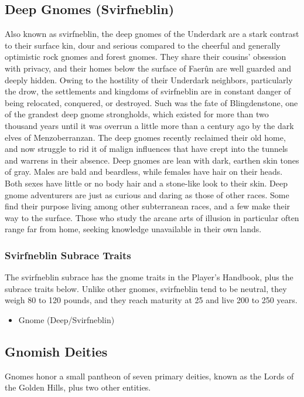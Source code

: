 \documentclass[10pt,a4paper,twoside,twocolumn,openany,bg=print,nodeprecatedcode]{dndbook}
\begin{document}
\subsection{Deep Gnomes (Svirfneblin)}
Also known as svirfneblin, the deep gnomes of the Underdark are a stark contrast to their surface kin, dour and serious compared to the cheerful and generally optimistic rock gnomes and forest gnomes. They share their cousins' obsession with privacy, and their homes below the surface of Faerûn are well guarded and deeply hidden.
Owing to the hostility of their Underdark neighbors, particularly the drow, the settlements and kingdoms of svirfneblin are in constant danger of being relocated, conquered, or destroyed. Such was the fate of Blingdenstone, one of the grandest deep gnome strongholds, which existed for more than two thousand years until it was overrun a little more than a century ago by the dark elves of Menzoberranzan. The deep gnomes recently reclaimed their old home, and now struggle to rid it of malign influences that have crept into the tunnels and warrens in their absence.
Deep gnomes are lean with dark, earthen skin tones of gray. Males are bald and beardless, while females have hair on their heads. Both sexes have little or no body hair and a stone-like look to their skin.
Deep gnome adventurers are just as curious and daring as those of other races. Some find their purpose living among other subterranean races, and a few make their way to the surface. Those who study the arcane arts of illusion in particular often range far from home, seeking knowledge unavailable in their own lands.
\subsubsection{Svirfneblin Subrace Traits}
The svirfneblin subrace has the gnome traits in the Player's Handbook, plus the subrace traits below. Unlike other gnomes, svirfneblin tend to be neutral, they weigh 80 to 120 pounds, and they reach maturity at 25 and live 200 to 250 years.

\begin{itemize}
\item Gnome (Deep/Svirfneblin)
\end{itemize}

\subsection{Gnomish Deities}
Gnomes honor a small pantheon of seven primary deities, known as the Lords of the Golden Hills, plus two other entities.
\end{document}
